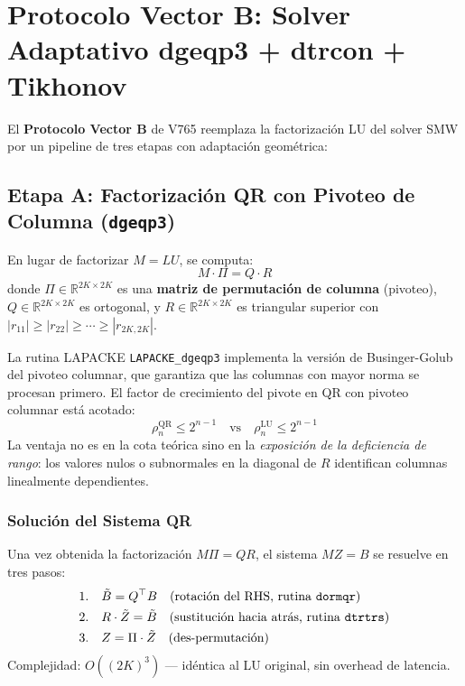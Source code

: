 \section{Protocolo Vector B: Solver Adaptativo dgeqp3 + dtrcon + Tikhonov}

El \textbf{Protocolo Vector B} de V765 reemplaza la factorización LU del solver SMW
por un pipeline de tres etapas con adaptación geométrica:

\subsection{Etapa A: Factorización QR con Pivoteo de Columna (\texttt{dgeqp3})}

En lugar de factorizar $M = LU$, se computa:
\begin{equation}
  M \cdot \Pi = Q \cdot R
  
\end{equation}
donde $\Pi \in \mathbb{R}^{2K \times 2K}$ es una \textbf{matriz de permutación de columna}
(pivoteo), $Q \in \mathbb{R}^{2K \times 2K}$ es ortogonal, y $R \in \mathbb{R}^{2K \times 2K}$
es triangular superior con $|r_{11}| \ge |r_{22}| \ge \cdots \ge |r_{2K,2K}|$.

La rutina LAPACKE \texttt{LAPACKE\_dgeqp3} implementa la versión de Businger-Golub del
pivoteo columnar, que garantiza que las columnas con mayor norma se procesan primero.
El factor de crecimiento del pivote en QR con pivoteo columnar está acotado:
\begin{equation}
  \rho_n^{\text{QR}} \le 2^{n-1} \quad \text{vs} \quad \rho_n^{\text{LU}} \le 2^{n-1}
\end{equation}
La ventaja no es en la cota teórica sino en la \textit{exposición de la deficiencia de rango}:
los valores nulos o subnormales en la diagonal de $R$ identifican columnas linealmente dependientes.

\subsubsection{Solución del Sistema QR}

Una vez obtenida la factorización $M\Pi = QR$, el sistema $MZ = B$ se resuelve en tres pasos:
\begin{align}
  1.\quad & \tilde{B} = Q^\top B \quad \text{(rotación del RHS, rutina \texttt{dormqr})} \\
  2.\quad & R \cdot \tilde{Z} = \tilde{B} \quad \text{(sustitución hacia atrás, rutina \texttt{dtrtrs})} \\
  3.\quad & Z = \Pi \cdot \tilde{Z} \quad \text{(des-permutación)}
\end{align}
Complejidad: $O((2K)^3)$ — idéntica al LU original, sin overhead de latencia.

